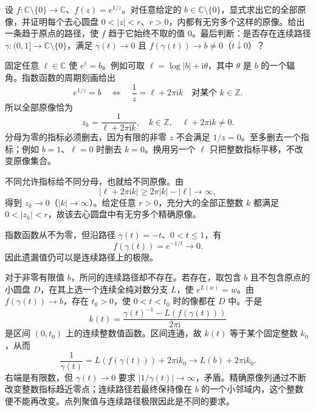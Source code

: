 \begin{exercise}\label{b3:ex:03-8}
设 \(f:\mathbb C\setminus\{0\}\rightarrow\mathbb C\)、\(f(z)=e^{1/z}\)。对任意给定的 \(b\in\mathbb C\setminus\{0\}\)，显式求出它的全部原像，并证明每个去心圆盘 \(0<|z|<r\)、\(r>0\)，内都有无穷多个这样的原像。给出一条趋于原点的路径，使 \(f\) 趋于它始终不取的值 \(0\)。最后判断：是否存在连续路径 \(\gamma:(0,1]\rightarrow\mathbb C\setminus\{0\}\)，满足 \(\gamma(t)\to0\) 且 \(f(\gamma(t))\to b\ne0\)（\(t\downarrow0\)）？
\end{exercise}
\begin{solution}
固定任意 \(\ell\in\mathbb C\) 使 \(e^\ell=b\)。例如可取 \(\ell=\log|b|+\mathrm{i}\theta\)，其中 \(\theta\) 是 \(b\) 的一个辐角。指数函数的周期刻画给出
\[
  e^{1/z}=b
  \quad\Longleftrightarrow\quad
  \frac1z=\ell+2\pi\mathrm{i}k
  \quad\text{对某个 }k\in\mathbb Z.
\]
所以全部原像恰为
\[
  z_k=\frac1{\ell+2\pi\mathrm{i}k},
  \quad k\in\mathbb Z,
  \quad\ell+2\pi\mathrm{i}k\ne0.
\]
分母为零的指标必须删去，因为有限的非零 \(z\) 不会满足 \(1/z=0\)。至多删去一个指标；例如 \(b=1\)、\(\ell=0\) 时删去 \(k=0\)。换用另一个 \(\ell\) 只把整数指标平移，不改变原像集合。

不同允许指标给不同分母，也就给不同原像。由
\[
  |\ell+2\pi\mathrm{i}k|\ge2\pi|k|-|\ell|\longrightarrow\infty,
\]
得到 \(z_k\to0\)（\(|k|\to\infty\)）。给定任意 \(r>0\)，充分大的全部正整数 \(k\) 都满足 \(0<|z_k|<r\)，故该去心圆盘中有无穷多个精确原像。

指数函数从不为零，但沿路径 \(\gamma(t)=-t\)、\(0<t\le1\)，有
\[
  f(\gamma(t))=e^{-1/t}\longrightarrow0.
\]
因此遗漏值仍可以是连续路径上的极限。

对于非零有限值 \(b\)，所问的连续路径却不存在。若存在，取包含 \(b\) 且不包含原点的小圆盘 \(D\)，在其上选一个连续全纯对数分支 \(L\)，使 \(e^{L(w)}=w\)。由 \(f(\gamma(t))\to b\)，存在 \(t_0>0\)，使 \(0<t<t_0\) 时的像都在 \(D\) 中。于是
\[
  k(t)=\frac{\gamma(t)^{-1}-L(f(\gamma(t)))}{2\pi\mathrm{i}}
\]
是区间 \((0,t_0)\) 上的连续整数值函数。区间连通，故 \(k(t)\) 等于某个固定整数 \(k_0\)，从而
\[
  \frac1{\gamma(t)}=L(f(\gamma(t)))+2\pi\mathrm{i}k_0
     \longrightarrow L(b)+2\pi\mathrm{i}k_0.
\]
右端是有限数，但 \(\gamma(t)\to0\) 要求 \(|1/\gamma(t)|\to\infty\)，矛盾。精确原像列通过不断改变整数指标趋近零点；连续路径若最终保持像在 \(b\) 的一个小邻域内，这个整数便不能再改变。点列聚值与连续路径极限因此是不同的要求。
\end{solution}

